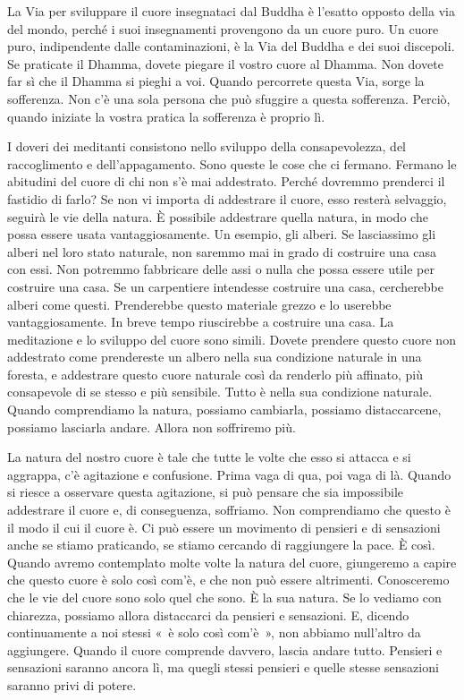 La Via per sviluppare il cuore insegnataci dal Buddha è l'esatto opposto
della via del mondo, perché i suoi insegnamenti provengono da un cuore
puro. Un cuore puro, indipendente dalle contaminazioni, è la Via del
Buddha e dei suoi discepoli. Se praticate il Dhamma, dovete piegare il
vostro cuore al Dhamma. Non dovete far sì che il Dhamma si pieghi a voi.
Quando percorrete questa Via, sorge la sofferenza. Non c'è una sola
persona che può sfuggire a questa sofferenza. Perciò, quando iniziate la
vostra pratica la sofferenza è proprio lì.

I doveri dei meditanti consistono nello sviluppo della consapevolezza,
del raccoglimento e dell'appagamento. Sono queste le cose che ci
fermano. Fermano le abitudini del cuore di chi non s'è mai addestrato.
Perché dovremmo prenderci il fastidio di farlo? Se non vi importa di
addestrare il cuore, esso resterà selvaggio, seguirà le vie della
natura. È possibile addestrare quella natura, in modo che possa essere
usata vantaggiosamente. Un esempio, gli alberi. Se lasciassimo gli
alberi nel loro stato naturale, non saremmo mai in grado di costruire
una casa con essi. Non potremmo fabbricare delle assi o nulla che possa
essere utile per costruire una casa. Se un carpentiere intendesse
costruire una casa, cercherebbe alberi come questi. Prenderebbe questo
materiale grezzo e lo userebbe vantaggiosamente. In breve tempo
riuscirebbe a costruire una casa. La meditazione e lo sviluppo del cuore
sono simili. Dovete prendere questo cuore non addestrato come
prendereste un albero nella sua condizione naturale in una foresta, e
addestrare questo cuore naturale così da renderlo più affinato, più
consapevole di se stesso e più sensibile. Tutto è nella sua condizione
naturale. Quando comprendiamo la natura, possiamo cambiarla, possiamo
distaccarcene, possiamo lasciarla andare. Allora non soffriremo più.

La natura del nostro cuore è tale che tutte le volte che esso si attacca
e si aggrappa, c'è agitazione e confusione. Prima vaga di qua, poi vaga
di là. Quando si riesce a osservare questa agitazione, si può pensare
che sia impossibile addestrare il cuore e, di conseguenza, soffriamo.
Non comprendiamo che questo è il modo il cui il cuore è. Ci può essere
un movimento di pensieri e di sensazioni anche se stiamo praticando, se
stiamo cercando di raggiungere la pace. È così. Quando avremo
contemplato molte volte la natura del cuore, giungeremo a capire che
questo cuore è solo così com'è, e che non può essere altrimenti.
Conosceremo che le vie del cuore sono solo quel che sono. È la sua
natura. Se lo vediamo con chiarezza, possiamo allora distaccarci da
pensieri e sensazioni. E, dicendo continuamente a noi stessi «~è solo
così com'è~», non abbiamo null'altro da aggiungere. Quando il cuore
comprende davvero, lascia andare tutto. Pensieri e sensazioni saranno
ancora lì, ma quegli stessi pensieri e quelle stesse sensazioni saranno
privi di potere.

